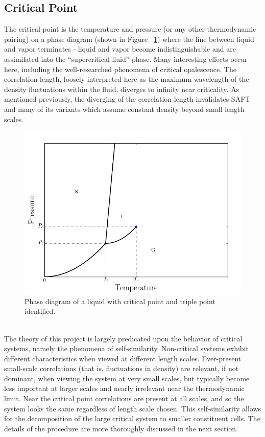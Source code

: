 \documentclass[12pt]{article}
\begin{document}
\subsection{Critical Point} 
The critical point is the temperature and pressure (or any other thermodynamic pairing) on a phase diagram (shown in Figure ~\ref{phase}) where the line between liquid and vapor terminates - liquid and vapor become indistinguishable and are assimilated into the ``supercritical fluid'' phase. Many interesting effects occur here, including the well-researched phenomena of critical opalescence. The correlation length, loosely interpreted here as the maximum wavelength of the density fluctuations within the fluid, diverges to infinity near criticality. As mentioned previously, the diverging of the correlation length invalidates SAFT and many of its variants which assume constant density beyond small length scales. 
\begin{figure}
    \centering
    \includegraphics[width=.75\textwidth]{phase.png}
    \caption{Phase diagram of a liquid with critical point and triple point identified.}
    \label{phase}
\end{figure}
\\

The theory of this project is largely predicated upon the behavior of critical systems, namely the phenomena of self-similarity. Non-critical systems exhibit different characteristics when viewed at different length scales. Ever-present small-scale correlations (that is, fluctuations in density) are relevant, if not dominant, when viewing the system at very small scales, but typically become less important at larger scales and nearly irrelevant near the thermodynamic limit. Near the critical point correlations are present at all scales, and so the system looks the same regardless of length scale chosen. This self-similarity allows for the decomposition of the large critical system to smaller constituent cells. The details of the procedure are more thoroughly discussed in the next section.
\end{document}
